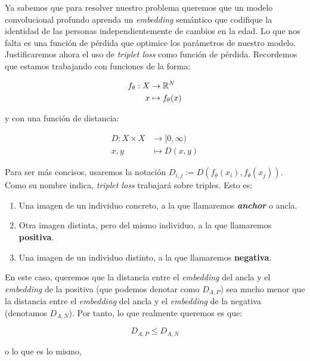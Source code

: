 Ya sabemos que para resolver nuestro problema queremos que un modelo convolucional profundo aprenda un \textit{embedding} semántico que codifique la identidad de las personas independientemente de cambios en la edad. Lo que nos falta es una función de pérdida que optimice los parámetros de nuestro modelo. Justificaremos ahora el uso de \textit{triplet loss} como función de pérdida. Recordemos que estamos trabajando con funciones de la forma:

\begin{equation}
	\begin{split}
		f_{\theta}: X & \to \mathbb{R}^N \\
		x & \mapsto f_{\theta}(x)
	\end{split}
\end{equation}

y con una función de distancia:

\begin{equation}
	\begin{split}
		D: X \times X & \to [0, \infty) \\
		x, y & \mapsto D(x, y)
	\end{split}
\end{equation}

Para ser más concisos, usaremos la notación $D_{i, j} := D(f_{\theta}(x_i), f_{\theta}(x_j))$. Como su nombre indica, \textit{triplet loss} trabajará sobre triples. Esto es:

\begin{enumerate}
	\item Una imagen de un individuo concreto, a la que llamaremos \textbf{\textit{anchor}} o ancla.
	\item Otra imagen distinta, pero del mismo individuo, a la que llamaremos \textbf{positiva}.
	\item Una imagen de un individuo distinto, a la que llamaremos \textbf{negativa}.
\end{enumerate}

En este caso, queremos que la distancia entre el \textit{embedding} del ancla y el \textit{embedding} de la positiva (que podemos denotar como $D_{A, P}$) sea mucho menor que la distancia entre el \textit{embedding} del ancla y el \textit{embedding} de la negativa (denotamos $D_{A, N}$). Por tanto, lo que realmente queremos es que:

\begin{equation}
	D_{A, P} \leq D_{A, N}
\end{equation}

o lo que es lo mismo,

